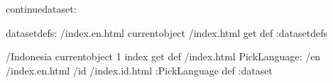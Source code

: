 \begin{ingrid}
continuedataset:

datasetdefs:
/index.en.html currentobject /index.html get def
:datasetdefs

/Indonesia currentobject 1 index get def
/index.html {
PickLanguage:
/en /index.en.html
/id /index.id.html
:PickLanguage
} def
:dataset
\end{ingrid}
